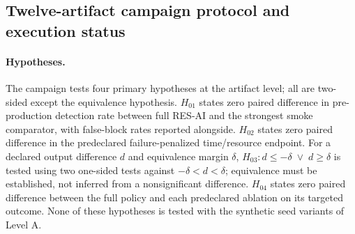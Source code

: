 \documentclass[pdflatex,sn-mathphys-num]{sn-jnl}
\theoremstyle{thmstylethree}
\newcommand{\tool}{\textsc{RES-AI}}
\begin{document}
\subsection{Twelve-artifact campaign protocol and execution status}\label{sec:campaign}
\paragraph{Hypotheses.} The campaign tests four primary hypotheses at the artifact level; all are two-sided except the equivalence hypothesis. $H_{01}$ states zero paired difference in pre-production detection rate between full \tool{} and the strongest smoke comparator, with false-block rates reported alongside. $H_{02}$ states zero paired difference in the predeclared failure-penalized time/resource endpoint. For a declared output difference $d$ and equivalence margin $\delta$, $H_{03}:d\leq-\delta\;\lor\;d\geq\delta$ is tested using two one-sided tests against $-\delta<d<\delta$; equivalence must be established, not inferred from a nonsignificant difference. $H_{04}$ states zero paired difference between the full policy and each predeclared ablation on its targeted outcome. None of these hypotheses is tested with the synthetic seed variants of Level A.
\end{document}
